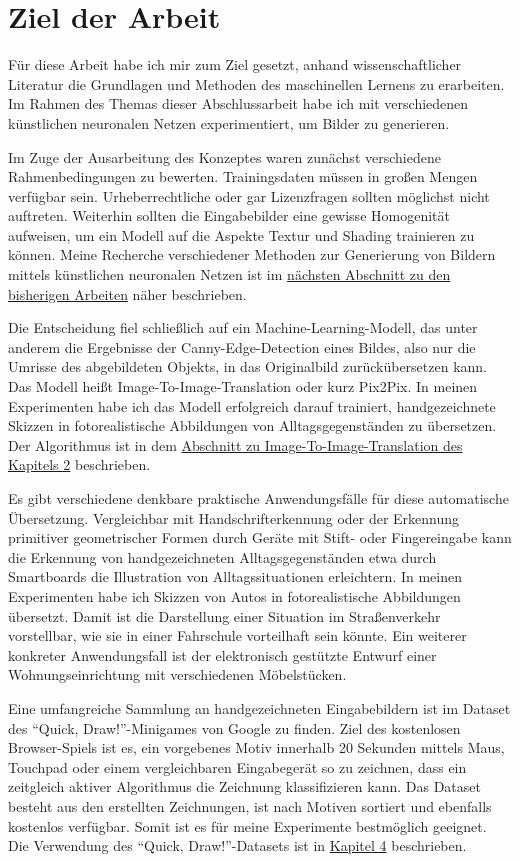 \section{Ziel der Arbeit}
\label{sec:ziel}
Für diese Arbeit habe ich mir zum Ziel gesetzt, anhand wissenschaftlicher Literatur die Grundlagen und Methoden des maschinellen Lernens zu erarbeiten. Im Rahmen des Themas dieser Abschlussarbeit habe ich mit verschiedenen künstlichen neuronalen Netzen experimentiert, um Bilder zu generieren.

Im Zuge der Ausarbeitung des Konzeptes waren zunächst verschiedene Rahmenbedingungen zu bewerten. Trainingsdaten müssen in großen Mengen verfügbar sein. Urheberrechtliche oder gar Lizenzfragen sollten möglichst nicht auftreten. Weiterhin sollten die Eingabebilder eine gewisse Homogenität aufweisen, um ein Modell auf die Aspekte Textur und Shading trainieren zu können. Meine Recherche verschiedener Methoden zur Generierung von Bildern mittels künstlichen neuronalen Netzen ist im \hyperref[sec:related]{nächsten Abschnitt zu den bisherigen Arbeiten} näher beschrieben.

Die Entscheidung fiel schließlich auf ein Machine-Learning-Modell, das unter anderem die Ergebnisse der Canny-Edge-Detection \cite{canny1986edge} eines Bildes, also nur die Umrisse des abgebildeten Objekts, in das Originalbild zurückübersetzen kann. Das Modell heißt Image-To-Image-Translation \cite{isola2018imagetoimage} oder kurz Pix2Pix. In meinen Experimenten habe ich das Modell erfolgreich darauf trainiert, handgezeichnete Skizzen in fotorealistische Abbildungen von Alltagsgegenständen zu übersetzen. Der Algorithmus ist in dem \hyperref[sec:pix2pix]{Abschnitt zu Image-To-Image-Translation des Kapitels 2} beschrieben.

Es gibt verschiedene denkbare praktische Anwendungsfälle für diese automatische Übersetzung. Vergleichbar mit Handschrifterkennung oder der Erkennung primitiver geometrischer Formen durch Geräte mit Stift- oder Fingereingabe kann die Erkennung von handgezeichneten Alltagsgegenständen etwa durch Smartboards die Illustration von Alltagssituationen erleichtern. In meinen Experimenten habe ich Skizzen von Autos in fotorealistische Abbildungen übersetzt. Damit ist die Darstellung einer Situation im Straßenverkehr vorstellbar, wie sie in einer Fahrschule vorteilhaft sein könnte. Ein weiterer konkreter Anwendungsfall ist der elektronisch gestützte Entwurf einer Wohnungseinrichtung mit verschiedenen Möbelstücken.

Eine umfangreiche Sammlung an handgezeichneten Eingabebildern ist im Dataset des ``Quick, Draw!''-Minigames von Google zu finden. Ziel des kostenlosen Browser-Spiels ist es, ein vorgebenes Motiv innerhalb 20 Sekunden mittels Maus, Touchpad oder einem vergleichbaren Eingabegerät so zu zeichnen, dass ein zeitgleich aktiver Algorithmus die Zeichnung klassifizieren kann. Das Dataset besteht aus den erstellten Zeichnungen, ist nach Motiven sortiert und ebenfalls kostenlos verfügbar. Somit ist es für meine Experimente bestmöglich geeignet. Die Verwendung des ``Quick, Draw!''-Datasets ist in \hyperref[ch:conduct]{Kapitel 4} beschrieben.

